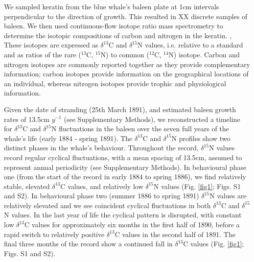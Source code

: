 \documentclass[a4paper,12pt]{article}
\begin{document}
We sampled keratin from the blue whale's baleen plate at 1cm intervals perpendicular to the direction of growth. 
This resulted in XX discrete samples of baleen. %
We then used continuous-flow isotope ratio mass spectrometry to determine the isotopic compositions of carbon and nitrogen in the keratin. ,
These isotopes are expressed as $\delta^{13}$C and $\delta^{15}$N values, i.e. relative to a standard and as ratios of the rare ($^{13}$C, $^{15}$N) to common ($^{12}$C, $^{14}$N) isotope\cite{west2006stable}.
Carbon and nitrogen isotopes are commonly reported together as they provide complementary information; carbon isotopes provide information on the geographical locations of an individual, whereas nitrogen isotopes provide trophic and physiological information\cite{west2006stable}.


Given the date of stranding (25th March 1891), and estimated baleen growth rates of 13.5cm $y^{-1}$ (see Supplementary Methods), we reconstructed a timeline for $\delta^{13}$C and $\delta^{15}$N fluctuations in the baleen over the seven full years of the whale's life (early 1884 - spring 1891). 
The $\delta^{13}$C and $\delta^{15}$N profiles show two distinct phases in the whale's behaviour. 
Throughout the record, $\delta^{15}$N values record regular cyclical fluctuations, with a mean spacing of 13.5cm, assumed to represent annual periodicity (see Supplementary Methods).  
In behavioural phase one (from the start of the record in early 1884 to spring 1886), we find relatively stable, elevated $\delta^{13}$C values, and relatively low $\delta^{15}$N values (Fig. \ref{fig1}; Figs. S1 and S2). 
In behavioural phase two (summer 1886 to spring 1891) $\delta^{15}$N values are relatively elevated and we see coincident cyclical fluctuations in both $\delta^{13}$C and $\delta^{15}$N values. 
In the last year of life the cyclical pattern is disrupted, with constant low $\delta^{13}$C values for approximately six months in the first half of 1890, before a rapid switch to relatively positive $\delta^{13}$C values in the second half of 1891. 
The final three months of the record show a continued fall in $\delta^{13}$C values (Fig. \ref{fig1}; Figs. S1 and S2).


\end{document}
